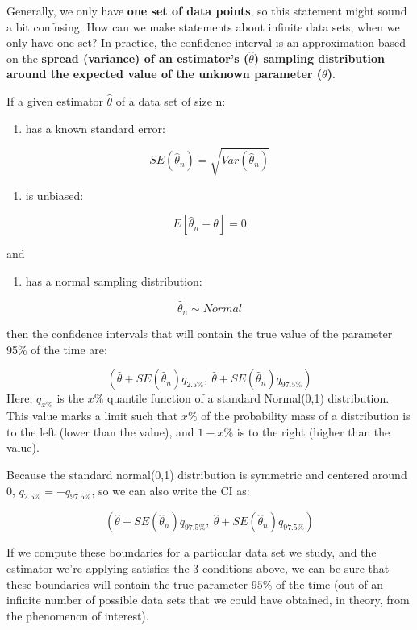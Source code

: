 \documentclass[
]{book}
\providecommand{\tightlist}{%
  \setlength{\itemsep}{0pt}\setlength{\parskip}{0pt}}
\begin{document}
Generally, we only have \textbf{one set of data points}, so this statement might sound a bit confusing. How can we make statements about infinite data sets, when we only have one set? In practice, the confidence interval is an approximation based on the \textbf{spread (variance) of an estimator's (\(\hat{\theta}\)) sampling distribution around the expected value of the unknown parameter (\(\theta\))}.

If a given estimator \(\hat{\theta}\) of a data set of size n:

\begin{enumerate}
\def\labelenumi{\arabic{enumi}.}
\tightlist
\item
  has a known standard error:
\end{enumerate}

\[SE(\hat{\theta}_n) = \sqrt{Var(\hat{\theta}_n)}\]

\begin{enumerate}
\def\labelenumi{\arabic{enumi}.}
\setcounter{enumi}{1}
\tightlist
\item
  is unbiased:
\end{enumerate}

\[E[\hat{\theta}_n - \theta] = 0\]

and

\begin{enumerate}
\def\labelenumi{\arabic{enumi}.}
\setcounter{enumi}{2}
\tightlist
\item
  has a normal sampling distribution:
\end{enumerate}

\[\hat{\theta}_n \sim Normal\]

then the confidence intervals that will contain the true value of the parameter 95\% of the time are:

\[(\hat{\theta} + SE(\hat{\theta}_n) q_{2.5\%}, \ \hat{\theta} + SE(\hat{\theta}_n) q_{97.5\%})\]
Here, \(q_{x\%}\) is the \(x\%\) quantile function of a standard Normal(0,1) distribution. This value marks a limit such that \(x\%\) of the probability mass of a distribution is to the left (lower than the value), and \(1-x\%\) is to the right (higher than the value).

Because the standard normal(0,1) distribution is symmetric and centered around 0, \(q_{2.5\%} = -q_{97.5\%}\), so we can also write the CI as:

\[(\hat{\theta} - SE(\hat{\theta}_n)  q_{97.5\%}, \
 \hat{\theta} + SE(\hat{\theta}_n) q_{97.5\%})\]

If we compute these boundaries for a particular data set we study, and the estimator we're applying satisfies the 3 conditions above, we can be sure that these boundaries will contain the true parameter \(95\%\) of the time (out of an infinite number of possible data sets that we could have obtained, in theory, from the phenomenon of interest).
\end{document}
